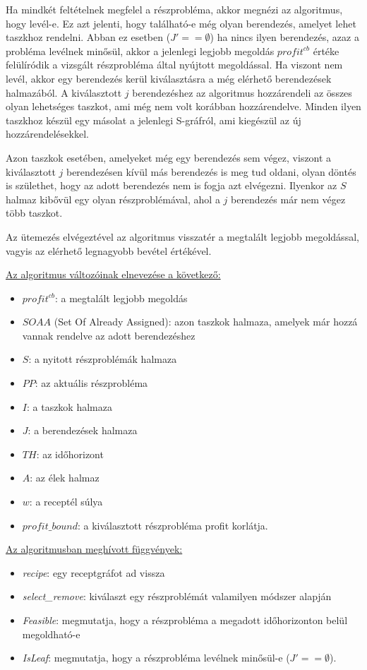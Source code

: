 Ha mindkét feltételnek megfelel a részprobléma, akkor megnézi az algoritmus, hogy levél-e. Ez azt jelenti, hogy található-e még olyan berendezés, amelyet lehet taszkhoz rendelni. Abban ez esetben ($J'== \emptyset$) ha nincs ilyen berendezés, azaz a probléma levélnek minősül, akkor a jelenlegi legjobb megoldás $profit^{cb}$ értéke felülíródik a vizsgált részprobléma által nyújtott megoldással. Ha viszont nem levél, akkor egy berendezés kerül kiválasztásra a még elérhető berendezések halmazából. A kiválasztott $j$ berendezéshez az algoritmus hozzárendeli az összes olyan lehetséges taszkot, ami még nem volt korábban hozzárendelve. Minden ilyen taszkhoz készül egy másolat a jelenlegi S-gráfról, ami kiegészül az új hozzárendelésekkel.

Azon taszkok esetében, amelyeket még egy berendezés sem végez, viszont a kiválasztott $j$ berendezésen kívül más berendezés is meg tud oldani, olyan döntés is születhet, hogy az adott berendezés nem is fogja azt elvégezni. Ilyenkor az $S$ halmaz kibővül egy olyan részproblémával, ahol a $j$ berendezés már nem végez több taszkot. 

Az ütemezés elvégeztével az algoritmus visszatér a megtalált legjobb megoldással, vagyis az elérhető legnagyobb bevétel értékével.

\newpage
\underline{Az algoritmus változóinak elnevezése a következő:}
\begin{itemize}
	\item $profit^{cb}$: a megtalált legjobb megoldás
	\item $SOAA$ (Set Of Already Assigned): azon taszkok halmaza, amelyek már hozzá vannak rendelve az adott berendezéshez
	\item $S$: a nyitott részproblémák halmaza
	\item $PP$: az aktuális részprobléma
	\item $I$: a taszkok halmaza
	\item $J$: a berendezések halmaza
	\item $TH$: az időhorizont
	\item $A$: az élek halmaz
	\item $w$: a receptél súlya
	\item $profit\_bound$: a kiválasztott részprobléma profit korlátja.
\end{itemize}

\underline{Az algoritmusban meghívott függvények:}
\begin{itemize}
	\item \textit{recipe}: egy receptgráfot ad vissza
	\item \textit{select\_remove}: kiválaszt egy részproblémát valamilyen módszer alapján
	\item \textit{Feasible}: megmutatja, hogy a részprobléma a megadott időhorizonton belül megoldható-e
	\item \textit{IsLeaf}: megmutatja, hogy a részprobléma levélnek minősül-e ($J'==\emptyset$).
\end{itemize}

